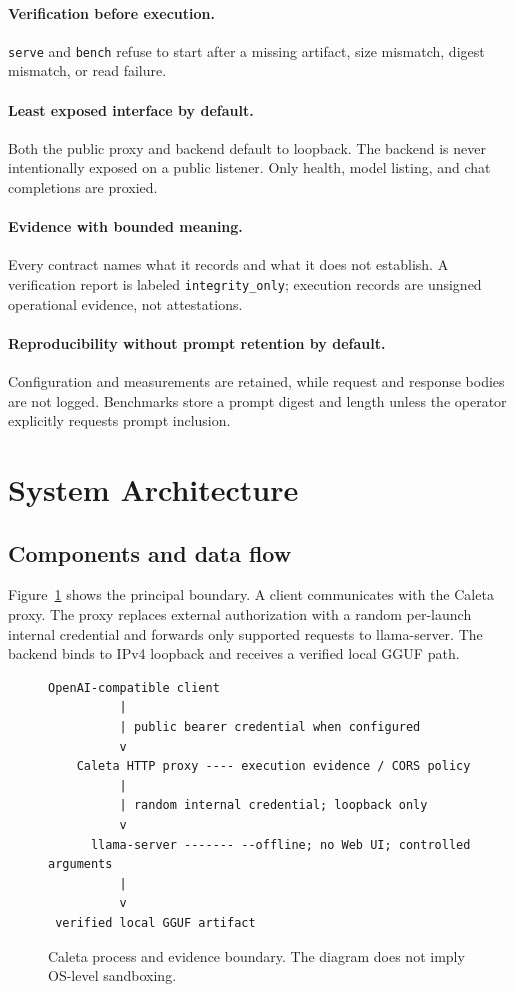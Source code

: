\documentclass[11pt,a4paper]{article}
\begin{document}
\paragraph{Verification before execution.} \texttt{serve} and \texttt{bench} refuse to start after a missing artifact, size mismatch, digest mismatch, or read failure.

\paragraph{Least exposed interface by default.} Both the public proxy and backend default to loopback. The backend is never intentionally exposed on a public listener. Only health, model listing, and chat completions are proxied.

\paragraph{Evidence with bounded meaning.} Every contract names what it records and what it does not establish. A verification report is labeled \texttt{integrity\_only}; execution records are unsigned operational evidence, not attestations.

\paragraph{Reproducibility without prompt retention by default.} Configuration and measurements are retained, while request and response bodies are not logged. Benchmarks store a prompt digest and length unless the operator explicitly requests prompt inclusion.

\section{System Architecture}

\subsection{Components and data flow}

Figure~\ref{fig:architecture} shows the principal boundary. A client communicates with the Caleta proxy. The proxy replaces external authorization with a random per-launch internal credential and forwards only supported requests to llama-server. The backend binds to IPv4 loopback and receives a verified local GGUF path.

\begin{figure}[ht]
\centering
\begin{lstlisting}
OpenAI-compatible client
          |
          | public bearer credential when configured
          v
    Caleta HTTP proxy ---- execution evidence / CORS policy
          |
          | random internal credential; loopback only
          v
      llama-server ------- --offline; no Web UI; controlled arguments
          |
          v
 verified local GGUF artifact
\end{lstlisting}
\caption{Caleta process and evidence boundary. The diagram does not imply OS-level sandboxing.}
\label{fig:architecture}
\end{figure}
\end{document}

